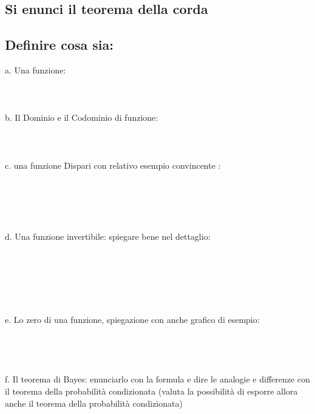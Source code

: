 \documentclass{article}
\begin{document}
\subsection{Si enunci il teorema della corda}
\subsection{Definire cosa sia:}
a. Una funzione: \\\\\\\\
b. Il Dominio e il Codominio di funzione: \\\\\\\\
c. una funzione Dispari con relativo esempio convincente : \\\\\\\\\\\\
d. Una funzione invertibile: spiegare bene nel dettaglio: \\\\\\\\\\\\\\
e. Lo zero di una funzione, spiegazione con anche grafico di esempio: \\\\\\\\\\
f. Il teorema di Bayes: enunciarlo con la formula e dire le analogie e differenze con il teorema della probabilità condizionata  (valuta la possibilità di esporre allora anche il teorema della probabilità condizionata) \\\\\\\\\\\\\\\\\\\\\\\\\\\\\\\\\\\\\\\\\\\\\\\\\\
\end{document}
